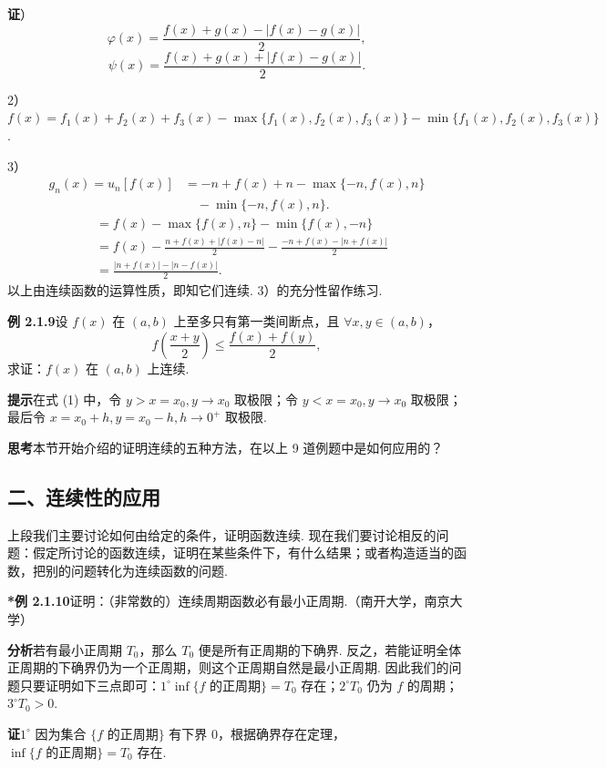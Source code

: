 \documentclass[UTF8,12pt,a4paper,fontset=fandol]{ctexart}
\begin{document}
\noindent\textbf{证}）
\[
  \varphi(x)=\frac{f(x)+g(x)-|f(x)-g(x)|}{2},
\]
\[
  \psi(x)=\frac{f(x)+g(x)+|f(x)-g(x)|}{2}.
\]

2）$f(x)=f_1(x)+f_2(x)+f_3(x)-\max\{f_1(x),f_2(x),f_3(x)\}-\min\{f_1(x),f_2(x),f_3(x)\}$.

3）
\[
\begin{aligned}
g_n(x)=u_n[f(x)]
&=-n+f(x)+n-\max\{-n,f(x),n\}\\
&\quad-\min\{-n,f(x),n\}.
\end{aligned}
\]
\[
\begin{aligned}
&=f(x)-\max\{f(x),n\}-\min\{f(x),-n\}\\
&=f(x)-\frac{n+f(x)+|f(x)-n|}{2}
  -\frac{-n+f(x)-|n+f(x)|}{2}\\
&=\frac{|n+f(x)|-|n-f(x)|}{2}.
\end{aligned}
\]
以上由连续函数的运算性质，即知它们连续. 3）的充分性留作练习.

\noindent\textbf{例 2.1.9}\quad 设 $f(x)$ 在 $(a,b)$ 上至多只有第一类间断点，且 $\forall x,y\in(a,b)$，
\[
  f\left(\frac{x+y}{2}\right)\le \frac{f(x)+f(y)}{2},
\tag{1}
\]
求证：$f(x)$ 在 $(a,b)$ 上连续.

\noindent\textbf{提示}\quad 在式 (1) 中，令 $y>x=x_0,y\to x_0$ 取极限；令 $y<x=x_0,y\to x_0$ 取极限；最后令 $x=x_0+h,y=x_0-h,h\to0^+$ 取极限.

\noindent\textbf{思考}\quad 本节开始介绍的证明连续的五种方法，在以上 9 道例题中是如何应用的？

\subsection*{二、连续性的应用}

上段我们主要讨论如何由给定的条件，证明函数连续. 现在我们要讨论相反的问题：假定所讨论的函数连续，证明在某些条件下，有什么结果；或者构造适当的函数，把别的问题转化为连续函数的问题.

\noindent\textbf{*例 2.1.10}\quad 证明：（非常数的）连续周期函数必有最小正周期.（南开大学，南京大学）

\noindent\textbf{分析}\quad 若有最小正周期 $T_0$，那么 $T_0$ 便是所有正周期的下确界. 反之，若能证明全体正周期的下确界仍为一个正周期，则这个正周期自然是最小正周期. 因此我们的问题只要证明如下三点即可：$1^\circ\inf\{f\text{ 的正周期}\}=T_0$ 存在；$2^\circ T_0$ 仍为 $f$ 的周期；$3^\circ T_0>0$.

\noindent\textbf{证}\quad $1^\circ$ 因为集合 $\{f\text{ 的正周期}\}$ 有下界 $0$，根据确界存在定理，$\inf\{f\text{ 的正周期}\}=T_0$ 存在.
\end{document}
